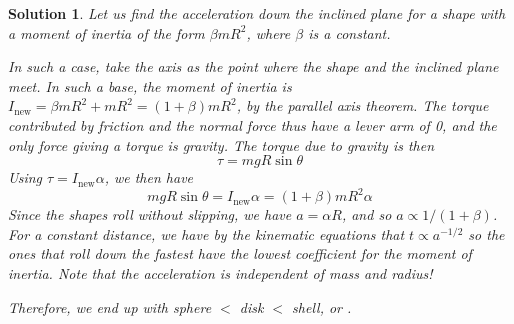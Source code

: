 \documentclass[12pt]{article}
\newtheorem*{solution}{Solution}
\theoremstyle{mystyle}
\begin{document}
\begin{solution}
    Let us find the acceleration down the inclined plane for a shape with a moment
    of inertia of the form $\beta mR^2$, where $\beta$ is a constant.

    In such a case, take the axis as the point where the shape and the inclined
    plane meet. In such a base, the moment of inertia is
    $I_\mathrm{new}=\beta mR^2+mR^2=(1+\beta)mR^2$, by the
    parallel axis theorem.
    The torque contributed by friction and the normal force thus have
    a lever arm of 0, and the only force giving a torque is gravity. The torque due
    to gravity is then \[\tau=mgR\sin\theta\]
    Using $\tau=I_\mathrm{new}\alpha$, we then have \[
        mgR\sin\theta=I_\mathrm{new}\alpha=(1+\beta) mR^2\alpha
    \]
    Since the shapes roll without slipping, we have $a=\alpha R$, and so
    $a\propto 1/(1+\beta)$. For a constant distance, we have by the
    kinematic equations that $t\propto a^{-1/2}$ so the ones that roll
    down the fastest have the lowest coefficient for the moment of inertia.
    Note that the acceleration is independent of mass and radius!

    Therefore, we end up with sphere $<$ disk $<$ shell, or .
\end{solution}
\end{document}

